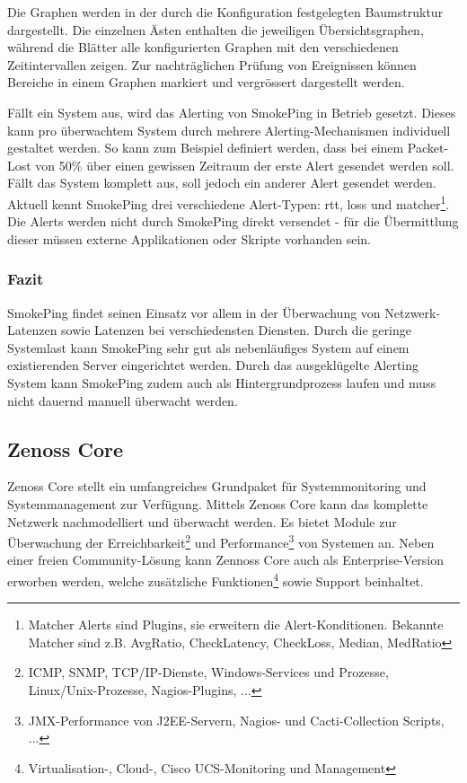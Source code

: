   Die Graphen werden in der durch die Konfiguration festgelegten Baumstruktur dargestellt. Die einzelnen \"Asten enthalten die jeweiligen \"Ubersichtsgraphen, w\"ahrend die Bl\"atter alle konfigurierten Graphen mit den verschiedenen Zeitintervallen zeigen. Zur nachtr\"aglichen Pr\"ufung von Ereignissen k\"onnen Bereiche in einem Graphen markiert und vergr\"ossert dargestellt werden.

  F\"allt ein System aus, wird das Alerting von SmokePing in Betrieb gesetzt. Dieses kann pro \"uberwachtem System durch mehrere Alerting-Mechanismen individuell gestaltet werden. So kann zum Beispiel definiert werden, dass bei einem Packet-Lost von 50\% \"uber einen gewissen Zeitraum der erste Alert gesendet werden soll. F\"allt das System komplett aus, soll jedoch ein anderer Alert gesendet werden. Aktuell kennt SmokePing drei verschiedene Alert-Typen: rtt, loss und matcher\footnote{Matcher Alerts sind Plugins, sie erweitern die Alert-Konditionen. Bekannte Matcher sind z.B. AvgRatio, CheckLatency, CheckLoss, Median, MedRatio}. Die Alerts werden nicht durch SmokePing direkt versendet - f\"ur die \"Ubermittlung dieser m\"ussen externe Applikationen oder Skripte vorhanden sein.

\subsubsection{Fazit} \label{sec:systeme-smoke-fazit}
  SmokePing findet seinen Einsatz vor allem in der \"Uberwachung von Netzwerk-Latenzen sowie Latenzen bei verschiedensten Diensten. Durch die geringe Systemlast kann SmokePing sehr gut als nebenl\"aufiges System auf einem existierenden Server eingerichtet werden. Durch das ausgekl\"ugelte Alerting System kann SmokePing zudem auch als Hintergrundprozess laufen und muss nicht dauernd manuell \"uberwacht werden.



\subsection{Zenoss Core} \label{sec:systeme-zenoss}  
  Zenoss Core\cite{zenoss} stellt ein umfangreiches Grundpaket f\"ur Systemmonitoring und Systemmanagement zur Verf\"ugung. Mittels Zenoss Core kann das komplette Netzwerk nachmodelliert und \"uberwacht werden. Es bietet Module zur \"Uberwachung der Erreichbarkeit\footnote{\label{foot:zenoss-monitor}ICMP, SNMP, TCP/IP-Dienste, Windows-Services und Prozesse, Linux/Unix-Prozesse, Nagios-Plugins, ...} und Performance\footnote{\label{foot:zenoss-performance}JMX-Performance von J2EE-Servern, Nagios- und Cacti-Collection Scripts, ...} von Systemen an. Neben einer freien Community-L\"osung kann Zennoss Core auch als Enterprise-Version erworben werden, welche zus\"atzliche Funktionen\footnote{\label{foot:zenoss-enterprise}Virtualisation-, Cloud-, Cisco UCS-Monitoring und Management} sowie Support beinhaltet.

